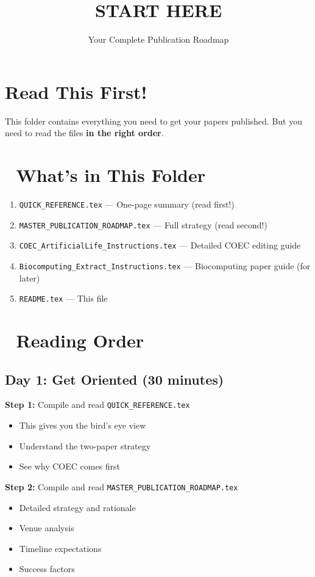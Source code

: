 \documentclass[11pt]{article}
\title{\Huge\textbf{START HERE}}
\author{\Large Your Complete Publication Roadmap}
\date{}
\begin{document}
\maketitle

\section*{\textcolor{urgent}{Read This First!}}

This folder contains everything you need to get your papers published. But you need to read the files \textbf{in the right order}.

\section*{📁 What's in This Folder}

\begin{enumerate}
    \item \texttt{QUICK\_REFERENCE.tex} — One-page summary (read first!)
    \item \texttt{MASTER\_PUBLICATION\_ROADMAP.tex} — Full strategy (read second!)
    \item \texttt{COEC\_ArtificialLife\_Instructions.tex} — Detailed COEC editing guide
    \item \texttt{Biocomputing\_Extract\_Instructions.tex} — Biocomputing paper guide (for later)
    \item \texttt{README.tex} — This file
\end{enumerate}

\section*{🎯 Reading Order}

\subsection*{Day 1: Get Oriented (30 minutes)}

\textbf{Step 1:} Compile and read \texttt{QUICK\_REFERENCE.tex}
\begin{itemize}
    \item This gives you the bird's eye view
    \item Understand the two-paper strategy
    \item See why COEC comes first
\end{itemize}

\textbf{Step 2:} Compile and read \texttt{MASTER\_PUBLICATION\_ROADMAP.tex}
\begin{itemize}
    \item Detailed strategy and rationale
    \item Venue analysis
    \item Timeline expectations
    \item Success factors
\end{itemize}
\end{document}
